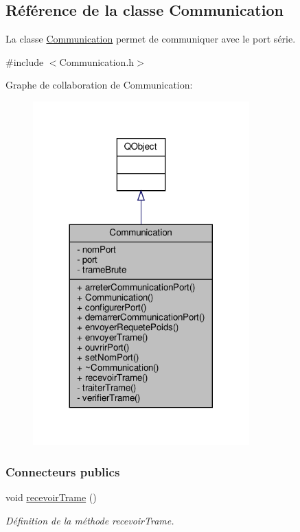 \hypertarget{class_communication}{}\subsection{Référence de la classe Communication}
\label{class_communication}


La classe \hyperlink{class_communication}{Communication} permet de communiquer avec le port série.  




{\ttfamily \#include $<$Communication.\+h$>$}



Graphe de collaboration de Communication\+:
\nopagebreak
\begin{figure}[H]
\begin{center}
\leavevmode
\includegraphics[width=236pt]{class_communication__coll__graph}
\end{center}
\end{figure}
\subsubsection*{Connecteurs publics}
\begin{DoxyCompactItemize}
\item 
void \hyperlink{class_communication_a0b8edc96112e71e1ec4a28cc6309cbbc}{recevoir\+Trame} ()
\begin{DoxyCompactList}\small\item\em Définition de la méthode recevoir\+Trame. \end{DoxyCompactList}\end{DoxyCompactItemize}
